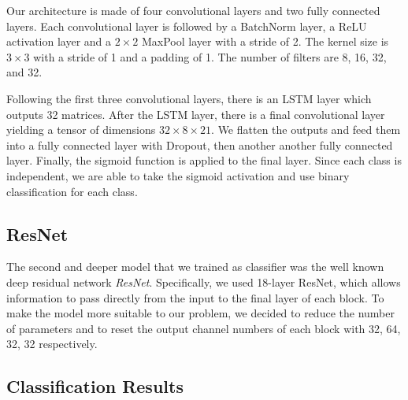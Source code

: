 \documentclass[runningheads,a4paper]{llncs}
\begin{document}
Our architecture is made of four convolutional layers and two fully connected layers. Each convolutional layer is followed by a BatchNorm layer, a ReLU activation layer and a $2 \times 2$  MaxPool layer with a stride of 2. The kernel size is $3 \times 3$ with a stride of 1 and a padding of 1. The number of filters are 8, 16, 32, and 32.

Following the first three convolutional layers, there is an LSTM layer which outputs 32 matrices. After the LSTM layer, there is a final convolutional layer yielding a tensor of dimensions $32\times 8 \times 21$. We flatten the outputs and feed them into a fully connected layer with Dropout, then another another fully connected layer. Finally, the sigmoid function is applied to the final layer. Since each class is independent, we are able to take the sigmoid activation and use binary classification for each class. %

\subsection{ResNet}

The second and deeper model that we trained as classifier was the well known deep residual network \emph{ResNet}. Specifically, we used 18-layer ResNet, which allows information to pass directly from the input to the final layer of each block. To make the model more suitable to our problem, we decided to reduce the number of parameters and to reset the output channel numbers of each block with 32, 64, 32, 32 respectively.

\subsection{Classification Results}
\end{document}
